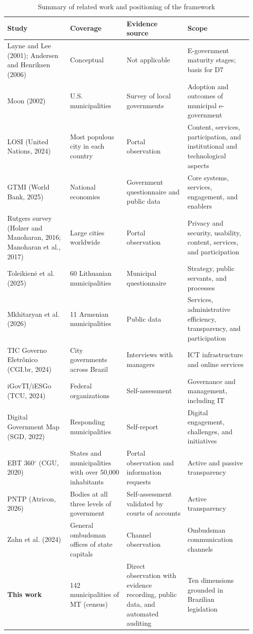 \documentclass[12pt]{article}
\begin{document}
\begin{table}[htbp]
\centering\small
\caption{Summary of related work and positioning of the framework}
\label{tab:related-work}
\begin{tabular}{L{3.1cm}L{3.2cm}L{3.2cm}L{4.0cm}}
\toprule
\textbf{Study} & \textbf{Coverage} & \textbf{Evidence source} & \textbf{Scope} \\ \midrule
Layne and Lee (2001); Andersen and Henriksen (2006) & Conceptual & Not applicable & E-government maturity stages; basis for D7 \\
Moon (2002) & U.S. municipalities & Survey of local governments & Adoption and outcomes of municipal e-government \\
LOSI (United Nations, 2024) & Most populous city in each country & Portal observation & Content, services, participation, and institutional and technological aspects \\
GTMI (World Bank, 2025) & National economies & Government questionnaire and public data & Core systems, services, engagement, and enablers \\
Rutgers survey (Holzer and Manoharan, 2016; Manoharan et al., 2017) & Large cities worldwide & Portal observation & Privacy and security, usability, content, services, and participation \\
Toleikienė et al. (2025) & 60 Lithuanian municipalities & Municipal questionnaire & Strategy, public servants, and processes \\
Mkhitaryan et al. (2026) & 11 Armenian municipalities & Public data & Services, administrative efficiency, transparency, and participation \\
TIC Governo Eletrônico (CGI.br, 2024) & City governments across Brazil & Interviews with managers & ICT infrastructure and online services \\
iGovTI/iESGo (TCU, 2024) & Federal organizations & Self-assessment & Governance and management, including IT \\
Digital Government Map (SGD, 2022) & Responding municipalities & Self-report & Digital engagement, challenges, and initiatives \\
EBT 360$^{\circ}$ (CGU, 2020) & States and municipalities with over 50,000 inhabitants & Portal observation and information requests & Active and passive transparency \\
PNTP (Atricon, 2026) & Bodies at all three levels of government & Self-assessment validated by courts of accounts & Active transparency \\
Zahn et al. (2024) & General ombudsman offices of state capitals & Channel observation & Ombudsman communication channels \\
\textbf{This work} & 142 municipalities of MT (census) & Direct observation with evidence recording, public data, and automated auditing & Ten dimensions grounded in Brazilian legislation \\ \bottomrule
\end{tabular}
\end{table}
\end{document}
